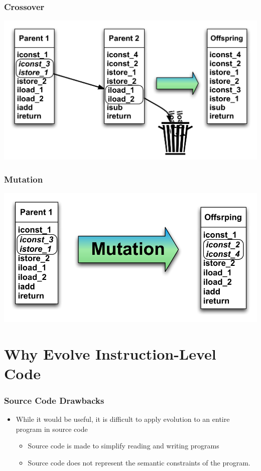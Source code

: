 \documentclass{beamer}
\begin{document}
\begin{frame}
	\frametitle{Crossover}

   \includegraphics[width=1\textwidth]{Illustrations/crossover.pdf}
       \\

\end{frame}

\begin{frame}
	\frametitle{Mutation}

   \includegraphics[width=1\textwidth]{Illustrations/mutation.pdf}
       \\

\end{frame}


\section[Why Instruction-level code]{Why Evolve Instruction-Level Code}

\begin{frame}
	\frametitle{Source Code Drawbacks}
	\begin{itemize}
		\item While it would be useful, it is difficult to apply evolution to an entire program in source code
			\\
		\begin{itemize}
			\item Source code is made to simplify reading and writing programs
			\item Source code does not represent the semantic constraints of the program.
		\end{itemize}
	\end{itemize}	
\end{frame}
\end{document}
